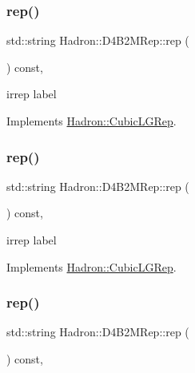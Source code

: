\subsubsection{\texorpdfstring{rep()}{rep()}\hspace{0.1cm}{\footnotesize\ttfamily [1/3]}}
{\footnotesize\ttfamily std\+::string Hadron\+::\+D4\+B2\+M\+Rep\+::rep (\begin{DoxyParamCaption}{ }\end{DoxyParamCaption}) const\hspace{0.3cm}{\ttfamily [inline]}, {\ttfamily [virtual]}}

irrep label 

Implements \mbox{\hyperlink{structHadron_1_1CubicLGRep_a50f5ddbb8f4be4cee0106fa9e8c75e6c}{Hadron\+::\+Cubic\+L\+G\+Rep}}.

\mbox{\label{structHadron_1_1D4B2MRep_ab0c418e49af7e2b749597e7b255d93f9}} 
\subsubsection{\texorpdfstring{rep()}{rep()}\hspace{0.1cm}{\footnotesize\ttfamily [2/3]}}
{\footnotesize\ttfamily std\+::string Hadron\+::\+D4\+B2\+M\+Rep\+::rep (\begin{DoxyParamCaption}{ }\end{DoxyParamCaption}) const\hspace{0.3cm}{\ttfamily [inline]}, {\ttfamily [virtual]}}

irrep label 

Implements \mbox{\hyperlink{structHadron_1_1CubicLGRep_a50f5ddbb8f4be4cee0106fa9e8c75e6c}{Hadron\+::\+Cubic\+L\+G\+Rep}}.

\mbox{\label{structHadron_1_1D4B2MRep_ab0c418e49af7e2b749597e7b255d93f9}} 
\subsubsection{\texorpdfstring{rep()}{rep()}\hspace{0.1cm}{\footnotesize\ttfamily [3/3]}}
{\footnotesize\ttfamily std\+::string Hadron\+::\+D4\+B2\+M\+Rep\+::rep (\begin{DoxyParamCaption}{ }\end{DoxyParamCaption}) const\hspace{0.3cm}{\ttfamily [inline]}, {\ttfamily [virtual]}}

